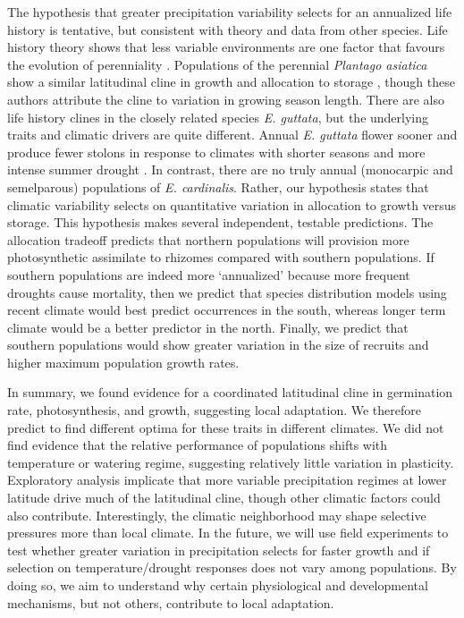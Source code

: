 \documentclass[11pt, oneside]{article}
\begin{document}
The hypothesis that greater precipitation variability selects for an annualized life history is tentative, but consistent with theory and data from other species. Life history theory shows that less variable environments are one factor that favours the evolution of perenniality \citep{Stearns_1976, Iwasa_Cohen_1989, Friedman_Rubin_2015}. Populations of the perennial \textit{Plantago asiatica} show a similar latitudinal cline in growth and allocation to storage \citep{Sawada_etal_1994}, though these authors attribute the cline to variation in growing season length. There are also life history clines in the closely related species \textit{E. guttata}, but the underlying traits and climatic drivers are quite different. Annual \textit{E. guttata} flower sooner and produce fewer stolons in response to climates with shorter seasons and more intense summer drought \citep{Lowry_Willis_2010, Friedman_etal_2015, Kooyers_etal_2015}. In contrast, there are no truly annual (monocarpic and semelparous) populations of \textit{E. cardinalis}. Rather, our hypothesis states that climatic variability selects on quantitative variation in allocation to growth versus storage. This hypothesis makes several independent, testable predictions. The allocation tradeoff predicts that northern populations will provision more photosynthetic assimilate to rhizomes compared with southern populations. If southern populations are indeed more `annualized' because more frequent droughts cause mortality, then we predict that species distribution models using recent climate would best predict occurrences in the south, whereas longer term climate would be a better predictor in the north. Finally, we predict that southern populations would show greater variation in the size of recruits and higher maximum population growth rates.

In summary, we found evidence for a coordinated latitudinal cline in germination rate, photosynthesis, and growth, suggesting local adaptation. We therefore predict to find different optima for  these traits in different climates. We did not find evidence that the relative performance of populations shifts with temperature or watering regime, suggesting relatively little variation in plasticity. Exploratory analysis implicate that more variable precipitation regimes at lower latitude drive much of the latitudinal cline, though other climatic factors could also contribute. Interestingly, the climatic neighborhood may shape selective pressures more than local climate. In the future, we will use field experiments to test whether greater variation in precipitation selects for faster growth and if selection on temperature/drought responses does not vary among populations. By doing so, we aim to understand why certain physiological and developmental mechanisms, but not others, contribute to local adaptation.
\end{document}
